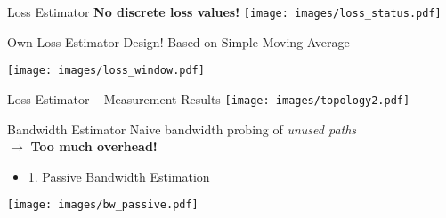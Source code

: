 \begin{frame}{Loss Estimator}
	\vspace*{-2em}
	\textbf{No discrete loss values!}
	\texttt{[image: images/loss\_status.pdf]}
	\pause
		\begin{block}{Own Loss Estimator Design!}
			Based on Simple Moving Average
		\end{block}
		\vspace*{0.4em}
		\texttt{[image: images/loss\_window.pdf]}
\end{frame}

\begin{frame}{Loss Estimator -- Measurement Results}
	\vspace*{-2em}
	\texttt{[image: images/topology2.pdf]}\\
\vspace*{1em}
\end{frame}



\begin{frame}{Bandwidth Estimator}
	\vspace*{-2em}
	Naive bandwidth probing of \emph{unused paths}\\ %
	$\rightarrow$ \textbf{Too much overhead!} 
	\begin{itemize}
		\item 1. Passive Bandwidth Estimation
	\end{itemize}
	\vspace*{.3em}
	\begin{center}
		\texttt{[image: images/bw\_passive.pdf]}
	\end{center}
	
\end{frame}

